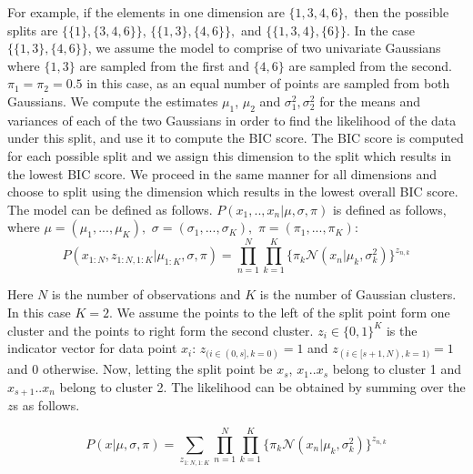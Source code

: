 For example, if the elements in one dimension are 
$ \lbrace 1, 3, 4, 6 \rbrace,$ then the possible splits are $ \lbrace \lbrace 1 \rbrace, \lbrace 3, 4, 6 \rbrace  \rbrace$,
$ \lbrace \lbrace 1, 3 \rbrace, \lbrace 4, 6 \rbrace \rbrace ,$  and $ \lbrace \lbrace 1, 3, 4 \rbrace , 
\lbrace 6 \rbrace \rbrace$.
In the case $ \lbrace \lbrace 1, 3 \rbrace, \lbrace 4, 6 \rbrace \rbrace $, we assume the model to comprise of two univariate Gaussians where $\lbrace 1,3 \rbrace $ are sampled from the first and $ \lbrace 4,6 \rbrace $ are sampled from the second.
$\pi_1 = \pi_2 = 0.5$ in this case, as an equal number of points are sampled from both Gaussians. 
We compute the estimates $\mu_1$, $\mu_2$ and $\sigma_1^2, \sigma_2^2$ for the means and variances of each
of the two Gaussians in order to find
the likelihood of the data under this split, and use
it to compute the BIC score.
The BIC score is computed for each possible
split and we assign this dimension to the
split which results in the lowest BIC score. 
We proceed in the same manner for all dimensions and choose 
to split using the dimension which results in the lowest overall BIC score. 
The model can be defined as follows.
$P(x_1,.., x_n | \mu, \sigma, \pi)$ is defined as follows, where $ \mu = \left( \mu_1, ..., \mu_K\right),  $ $\sigma = \left( \sigma_1, ..., \sigma_K\right),$ $ \pi = \left( \pi_1, ..., \pi_K \right)$:
\begin{equation}\label{likprob}
    P(x_{1:N}, z_{1:N, 1:K} |  \mu_{1:K},  \sigma, \pi) = \prod_{n=1}^{N} \prod_{k=1}^{K} \{\pi_k\mathcal{N}(x_n | \mu_k, \sigma_k^2)\}^{z_{n,k}}
\end{equation}

Here $N$ is the number of observations and $K$ is the number of Gaussian clusters. In this case $K=2$. We assume the points to the left of the split point form one cluster and the points to right form the second cluster.  $z_i \in \{0, 1\}^K$ is the indicator vector for data point $x_i$: $z_{(i \in (0, s], k = 0)} = 1$  and $z_{(i \in [s+1, N), k = 1)} = 1$ and 0 otherwise. 
Now, letting the split point be $x_s$,  $x_1..x_s$ belong to cluster 1 and $x_{s+1}..x_n$ belong to cluster 2.
The likelihood can be obtained by summing over the $z$s as follows.


\begin{equation}\label{likprob2}
    P(x|  \mu,  \sigma, \pi) = \sum_{z_{1:N, 1:K}}\prod_{n=1}^{N} \prod_{k=1}^{K} \{\pi_k\mathcal{N}(x_n | \mu_k, \sigma_k^2)\}^{z_{n,k}}
\end{equation}




